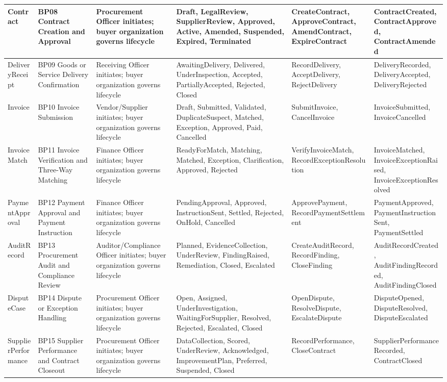 \documentclass[conference]{IEEEtran}
\begin{document}
\begin{table}[t]
\begin{tabularx}{\textwidth}{|L{2.0cm}|L{2.5cm}|Y|Y|L{2.5cm}|L{2.5cm}|}
Contract & BP08 Contract Creation and Approval & Procurement Officer initiates; buyer organization governs lifecycle & Draft, LegalReview, SupplierReview, Approved, Active, Amended, Suspended, Expired, Terminated & CreateContract, ApproveContract, AmendContract, ExpireContract & ContractCreated, ContractApproved, ContractAmended \\ \hline
DeliveryReceipt & BP09 Goods or Service Delivery Confirmation & Receiving Officer initiates; buyer organization governs lifecycle & AwaitingDelivery, Delivered, UnderInspection, Accepted, PartiallyAccepted, Rejected, Closed & RecordDelivery, AcceptDelivery, RejectDelivery & DeliveryRecorded, DeliveryAccepted, DeliveryRejected \\ \hline
Invoice & BP10 Invoice Submission & Vendor/Supplier initiates; buyer organization governs lifecycle & Draft, Submitted, Validated, DuplicateSuspect, Matched, Exception, Approved, Paid, Cancelled & SubmitInvoice, CancelInvoice & InvoiceSubmitted, InvoiceCancelled \\ \hline
InvoiceMatch & BP11 Invoice Verification and Three-Way Matching & Finance Officer initiates; buyer organization governs lifecycle & ReadyForMatch, Matching, Matched, Exception, Clarification, Approved, Rejected & VerifyInvoiceMatch, RecordExceptionResolution & InvoiceMatched, InvoiceExceptionRaised, InvoiceExceptionResolved \\ \hline
PaymentApproval & BP12 Payment Approval and Payment Instruction & Finance Officer initiates; buyer organization governs lifecycle & PendingApproval, Approved, InstructionSent, Settled, Rejected, OnHold, Cancelled & ApprovePayment, RecordPaymentSettlement & PaymentApproved, PaymentInstructionSent, PaymentSettled \\ \hline
AuditRecord & BP13 Procurement Audit and Compliance Review & Auditor/Compliance Officer initiates; buyer organization governs lifecycle & Planned, EvidenceCollection, UnderReview, FindingRaised, Remediation, Closed, Escalated & CreateAuditRecord, RecordFinding, CloseFinding & AuditRecordCreated, AuditFindingRecorded, AuditFindingClosed \\ \hline
DisputeCase & BP14 Dispute or Exception Handling & Procurement Officer initiates; buyer organization governs lifecycle & Open, Assigned, UnderInvestigation, WaitingForSupplier, Resolved, Rejected, Escalated, Closed & OpenDispute, ResolveDispute, EscalateDispute & DisputeOpened, DisputeResolved, DisputeEscalated \\ \hline
SupplierPerformance & BP15 Supplier Performance and Contract Closeout & Procurement Officer initiates; buyer organization governs lifecycle & DataCollection, Scored, UnderReview, Acknowledged, ImprovementPlan, Preferred, Suspended, Closed & RecordPerformance, CloseContract & SupplierPerformanceRecorded, ContractClosed \\ \hline
\end{tabularx}
\end{table}
\end{document}
